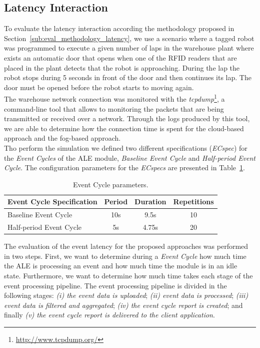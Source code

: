 \subsection{Latency Interaction}
\label{sub:eval_exp_latency}
To evaluate the latency interaction according the methodology proposed in Section~\ref{sub:eval_methodology_latency},
we use a scenario where a tagged robot was programmed to execute a given number of laps in the
warehouse plant where exists an automatic door that opens when one of the \gls{RFID} readers
that are placed in the plant detects that the robot is approaching. During the lap the robot stops during 5 seconds
in front of the door and then continues its lap. The door must be opened before the robot starts
to moving again.\\

The warehouse network connection was monitored with the \textit{tcpdump}\footnote{\url{http://www.tcpdump.org/}},
a command-line tool that allows to monitoring the packets that are being transmitted or received over
a network. Through the logs produced by this tool, we are able to determine how the connection time
is spent for the cloud-based approach and the fog-based approach.\\

Tho perform the simulation we defined two different specifications (\textit{ECspec}) for the
\textit{Event Cycles} of the \gls{ALE} module, \textit{Baseline Event Cycle} and
\textit{Half-period Event Cycle}. The configuration parameters for the \textit{ECspecs} are presented
in Table~\ref{table:ecspec_parameters}.

\begin{table}[ht!]
 \begin{tabular}{|l|c|c|c|}
  \hline
  Event Cycle Specification & Period  & Duration & Repetitions \\ \hline
  Baseline Event Cycle      &  10s    & 9.5s     & 10          \\ \hline
  Half-period Event Cycle   &   5s    & 4.75s    & 20          \\ \hline
 \end{tabular}
 \caption[Event Cycle parameters.]{Event Cycle parameters.}
 \label{table:ecspec_parameters}
\end{table}

The evaluation of the event latency for the proposed approaches was performed in two steps. First,
we want to determine during a \textit{Event Cycle} how much time the \gls{ALE} is processing an event
and how much time the module is in an idle state. Furthermore, we want to determine how much time
takes each stage of the event processing pipeline. The event processing pipeline is divided in the
following stages: \textit{(i) the event data is uploaded}; \textit{(ii) event data is processed};
\textit{(iii) event data is filtered and aggregated}; \textit{(iv) the event cycle report is created};
and finally \textit{(v) the event cycle report is delivered to the client application}.

